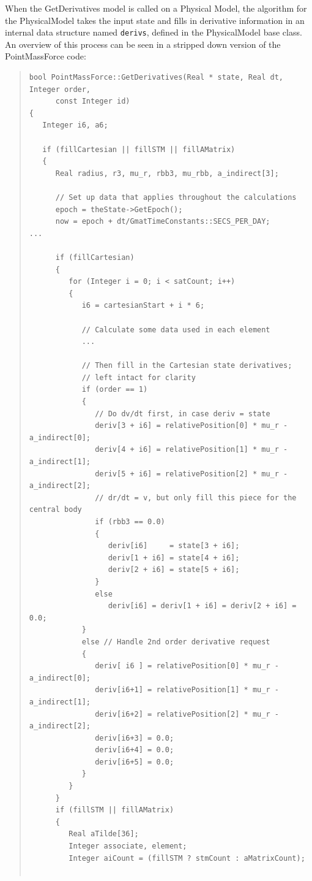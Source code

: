 \documentclass[letterpaper,10pt]{article}
\begin{document}
When the GetDerivatives model is called on a Physical Model, the algorithm for
the PhysicalModel takes the input state and fills in derivative information in
an internal data structure named \texttt{derivs}, defined in the PhysicalModel
base class.  An overview of this process can be seen in a stripped down version
of the PointMassForce code:

\begin{quote}
\begin{verbatim}
bool PointMassForce::GetDerivatives(Real * state, Real dt, Integer order, 
      const Integer id)
{
   Integer i6, a6;

   if (fillCartesian || fillSTM || fillAMatrix)
   {
      Real radius, r3, mu_r, rbb3, mu_rbb, a_indirect[3];

      // Set up data that applies throughout the calculations
      epoch = theState->GetEpoch();
      now = epoch + dt/GmatTimeConstants::SECS_PER_DAY;
...
      
      if (fillCartesian)
      {
         for (Integer i = 0; i < satCount; i++) 
         {
            i6 = cartesianStart + i * 6;

            // Calculate some data used in each element
            ...

            // Then fill in the Cartesian state derivatives; 
            // left intact for clarity
            if (order == 1) 
            {
               // Do dv/dt first, in case deriv = state
               deriv[3 + i6] = relativePosition[0] * mu_r - a_indirect[0];
               deriv[4 + i6] = relativePosition[1] * mu_r - a_indirect[1];
               deriv[5 + i6] = relativePosition[2] * mu_r - a_indirect[2];
               // dr/dt = v, but only fill this piece for the central body
               if (rbb3 == 0.0)
               {
                  deriv[i6]     = state[3 + i6];
                  deriv[1 + i6] = state[4 + i6];
                  deriv[2 + i6] = state[5 + i6];
               }
               else
                  deriv[i6] = deriv[1 + i6] = deriv[2 + i6] = 0.0;
            } 
            else // Handle 2nd order derivative request
            {
               deriv[ i6 ] = relativePosition[0] * mu_r - a_indirect[0]; 
               deriv[i6+1] = relativePosition[1] * mu_r - a_indirect[1]; 
               deriv[i6+2] = relativePosition[2] * mu_r - a_indirect[2]; 
               deriv[i6+3] = 0.0; 
               deriv[i6+4] = 0.0; 
               deriv[i6+5] = 0.0; 
            }
         }
      }
      if (fillSTM || fillAMatrix)
      {
         Real aTilde[36];
         Integer associate, element;
         Integer aiCount = (fillSTM ? stmCount : aMatrixCount);


\end{verbatim}
\end{quote}
\end{document}
